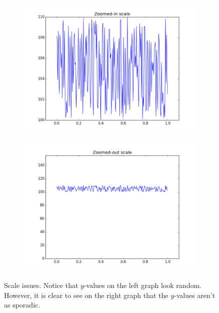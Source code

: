 \begin{figure}
\centering
\begin{subfigure}{.5\textwidth}
  \centering
  \includegraphics[width=\textwidth]{scale_line_zoomed_in.png}
\end{subfigure}%
\begin{subfigure}{.5\textwidth}
  \centering
  \includegraphics[width=\textwidth]{scale_line_zoomed_out.png}
\end{subfigure}
\caption{Scale issues.  Notice that $y$-values on the left graph look random.  However, it is clear to see on the right graph that the $y$-values aren't as sporadic.}
\label{fig:line_scale}
\end{figure}



